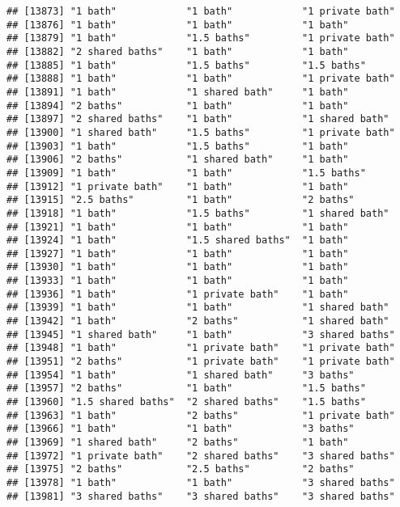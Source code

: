 \documentclass[
]{article}
\begin{document}
\begin{verbatim}
## [13873] "1 bath"            "1 bath"            "1 private bath"   
## [13876] "1 bath"            "1 bath"            "1 bath"           
## [13879] "1 bath"            "1.5 baths"         "1 private bath"   
## [13882] "2 shared baths"    "1 bath"            "1 bath"           
## [13885] "1 bath"            "1.5 baths"         "1.5 baths"        
## [13888] "1 bath"            "1 bath"            "1 private bath"   
## [13891] "1 bath"            "1 shared bath"     "1 bath"           
## [13894] "2 baths"           "1 bath"            "1 bath"           
## [13897] "2 shared baths"    "1 bath"            "1 shared bath"    
## [13900] "1 shared bath"     "1.5 baths"         "1 private bath"   
## [13903] "1 bath"            "1.5 baths"         "1 bath"           
## [13906] "2 baths"           "1 shared bath"     "1 bath"           
## [13909] "1 bath"            "1 bath"            "1.5 baths"        
## [13912] "1 private bath"    "1 bath"            "1 bath"           
## [13915] "2.5 baths"         "1 bath"            "2 baths"          
## [13918] "1 bath"            "1.5 baths"         "1 shared bath"    
## [13921] "1 bath"            "1 bath"            "1 bath"           
## [13924] "1 bath"            "1.5 shared baths"  "1 bath"           
## [13927] "1 bath"            "1 bath"            "1 bath"           
## [13930] "1 bath"            "1 bath"            "1 bath"           
## [13933] "1 bath"            "1 bath"            "1 bath"           
## [13936] "1 bath"            "1 private bath"    "1 bath"           
## [13939] "1 bath"            "1 bath"            "1 shared bath"    
## [13942] "1 bath"            "2 baths"           "1 shared bath"    
## [13945] "1 shared bath"     "1 bath"            "3 shared baths"   
## [13948] "1 bath"            "1 private bath"    "1 private bath"   
## [13951] "2 baths"           "1 private bath"    "1 private bath"   
## [13954] "1 bath"            "1 shared bath"     "3 baths"          
## [13957] "2 baths"           "1 bath"            "1.5 baths"        
## [13960] "1.5 shared baths"  "2 shared baths"    "1.5 baths"        
## [13963] "1 bath"            "2 baths"           "1 private bath"   
## [13966] "1 bath"            "1 bath"            "3 baths"          
## [13969] "1 shared bath"     "2 baths"           "1 bath"           
## [13972] "1 private bath"    "2 shared baths"    "3 shared baths"   
## [13975] "2 baths"           "2.5 baths"         "2 baths"          
## [13978] "1 bath"            "1 bath"            "3 shared baths"   
## [13981] "3 shared baths"    "3 shared baths"    "3 shared baths"   

\end{verbatim}
\end{document}
